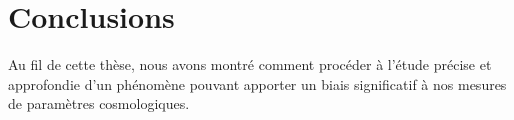 \documentclass[../main/main.tex]{subfiles}
\begin{document}
\chapter*{Conclusions}\label{ch:conc}

Au fil de cette thèse, nous avons montré comment procéder à l'étude précise et
approfondie d'un phénomène pouvant apporter un biais significatif à nos mesures
de paramètres cosmologiques.
\end{document}
